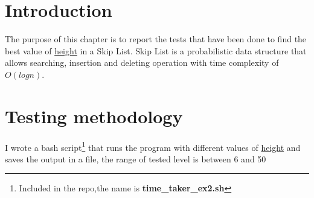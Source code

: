 \section{Introduction}
The purpose of this chapter is to report the tests that have been done to find the best value of \underline{height} in a Skip List.
Skip List is a probabilistic data structure that allows searching, insertion and deleting operation with time complexity of $O(log n)$.

\section{Testing methodology}
I wrote a bash script\footnote{Included in the repo,the name is \textbf{time\_taker\_ex2.sh}} that runs the program with different values of \underline{height} and saves the output in a file, the range of tested level is between 6 and 50
\newline
